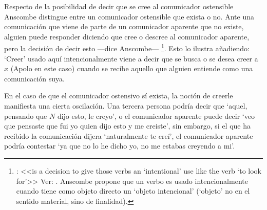 Respecto de la posibilidad de decir que se cree al comunicador ostensible
Anscombe distingue entre un comunicador ostensible que exista o no. Ante una
comunicación que viene de parte de un comunicador aparente que no existe,
alguien puede responder diciendo que cree o descree al comunicador aparente,
pero la decisión de decir esto ---dice Anscombe--- \footnote{\cite[7]{anscombe2008faith:tobelieve}: <<is a decision to give
  those verbs an `intentional' use like the verb `to look for'>> Ver:
  \cite{anscombe1981metaphysics:intsens}. Anscombe propone que un verbo es usado
  intencionalmente cuando tiene como objeto directo un `objeto intencional'
  (`objeto' no en el sentido material, sino de finalidad).}. Esto lo ilustra
añadiendo:  `Creer' usado aquí intencionalmente viene a decir
que se busca o se desea creer a $x$ (Apolo en este caso) cuando se recibe
aquello que alguien entiende como una comunicación suya.

En el caso de que el comunicador ostensivo sí exista, la noción de creerle
manifiesta una cierta oscilación. Una tercera persona podría decir que `aquel,
pensando que $N$ dijo esto, le creyo', o el comunicador aparente puede decir
`veo que pensaste que fui yo quien dijo esto y me creiste', sin embargo, si el
que ha recibido la comunicación dijera `naturalmente te creí', el comunicador
aparente podría contestar `ya que no lo he dicho yo, no me estabas creyendo a
mi'\autocite[Cf.~][8]{anscombe2008faith:tobelieve}.


